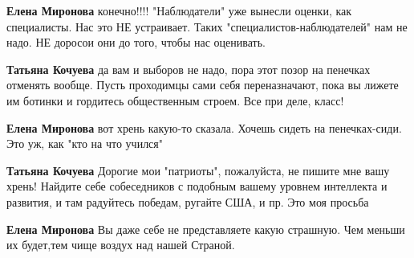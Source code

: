 \begin{itemize}
\begin{itemize}
\textbf{Елена Миронова} конечно!!!! "Наблюдатели" уже вынесли оценки, как
специалисты. Нас это НЕ устраивает. Таких "специалистов-наблюдателей" нам не
надо. НЕ доросои они до того, чтобы нас оценивать.

 
\textbf{Татьяна Кочуева} да вам и выборов не надо, пора этот позор на пенечках отменять вообще. Пусть проходимцы сами себя переназначают, пока вы лижете им ботинки и гордитесь общественным строем. Все при деле, класс!

 
\textbf{Елена Миронова} вот хрень какую-то сказала. Хочешь сидеть на пенечках-сиди. Это уж, как "кто на что учился"

 
\textbf{Татьяна Кочуева} Дорогие мои "патриоты", пожалуйста, не пишите мне вашу хрень! Найдите себе собеседников с подобным вашему уровнем интеллекта и развития, и там радуйтесь победам, ругайте США, и пр. Это моя просьба

 
\textbf{Елена Миронова} Вы даже себе не представляете какую страшную. Чем меньши их будет,тем чище воздух над нашей Страной.

 

\end{itemize}
\end{itemize}
